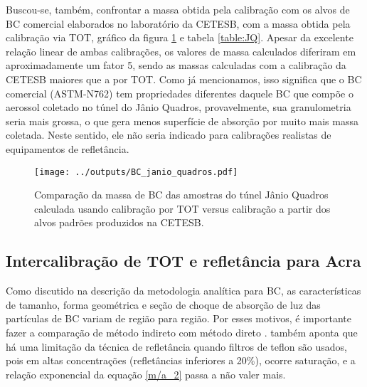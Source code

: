 Buscou-se, também, confrontar a massa obtida pela calibração com os  
alvos de BC comercial elaborados no laboratório da CETESB, com a massa 
obtida pela calibração via TOT, gráfico da figura \ref{fig:JQ} e tabela
\ref{table:JQ}. Apesar da excelente relação linear de ambas calibrações, os 
valores de massa calculados diferiram em aproximadamente um fator 5, sendo as 
massas calculadas com a calibração da CETESB maiores que a por TOT.  
Como já mencionamos, isso significa que o BC comercial (ASTM-N762) tem 
propriedades diferentes daquele BC que compõe o aerossol coletado no túnel do 
Jânio Quadros, provavelmente, sua granulometria seria mais grossa, o que gera 
menos superfície de absorção por muito mais massa coletada. Neste sentido, ele 
não seria indicado para calibrações realistas de equipamentos de refletância. 

\begin{figure}[H]
  \centering
  \begin{minipage}[b]{0.5\linewidth}
    \texttt{[image: ../outputs/BC\_janio\_quadros.pdf]}
    \caption{Comparação da massa de BC das amostras do túnel Jânio Quadros 
             calculada usando calibração por TOT versus calibração a partir dos 
             alvos padrões produzidos na CETESB. \label{fig:JQ}}
  \end{minipage}
  \hspace{0.5cm}
  \begin{minipage}[b]{0.45\linewidth}
    \begin{small}
      
    \end{small}
  \end{minipage}
\end{figure}

\newpage
\subsection{Intercalibração de TOT e refletância para Acra}

Como discutido na descrição da metodologia analítica para BC, as características
de tamanho, forma geométrica e seção de choque de absorção de luz das 
partículas de BC variam de região para região.
Por esses motivos, é importante fazer a comparação de método indireto com método
direto \citep{quincey2007}. \citet{taha2007} também aponta que há uma limitação 
da técnica de refletância quando filtros de teflon são usados, pois em altas 
concentrações (refletâncias inferiores a 20\%), ocorre saturação, e a 
relação exponencial da equação \ref{m/a_2} passa a não valer 
mais. 

